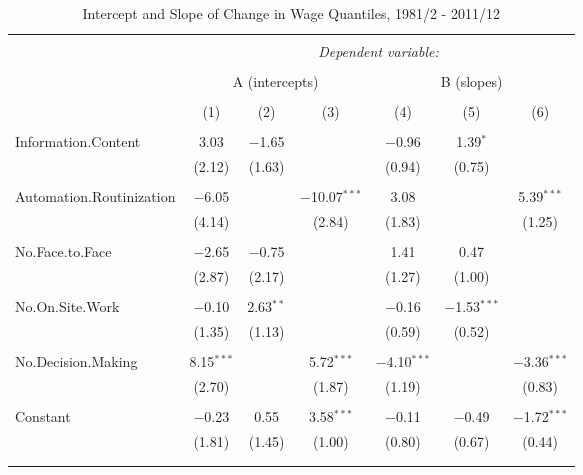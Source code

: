 \documentclass{article}
\begin{document}
\begin{table}[!htbp] \centering 
  \caption{Intercept and Slope of Change in Wage Quantiles, 1981/2 - 2011/12} 
  \label{} 
\begin{tabular}{@{\extracolsep{5pt}}lcccccc} 
\\[-1.8ex]\hline 
\hline \\[-1.8ex] 
 & \multicolumn{6}{c}{\textit{Dependent variable:}} \\ 
\cline{2-7} 
\\[-1.8ex] & \multicolumn{3}{c}{A (intercepts)} & \multicolumn{3}{c}{B (slopes)} \\ 
\\[-1.8ex] & (1) & (2) & (3) & (4) & (5) & (6)\\ 
\hline \\[-1.8ex] 
 Information.Content & 3.03 & $-$1.65 &  & $-$0.96 & 1.39$^{*}$ &  \\ 
  & (2.12) & (1.63) &  & (0.94) & (0.75) &  \\ 
  & & & & & & \\ 
 Automation.Routinization & $-$6.05 &  & $-$10.07$^{***}$ & 3.08 &  & 5.39$^{***}$ \\ 
  & (4.14) &  & (2.84) & (1.83) &  & (1.25) \\ 
  & & & & & & \\ 
 No.Face.to.Face & $-$2.65 & $-$0.75 &  & 1.41 & 0.47 &  \\ 
  & (2.87) & (2.17) &  & (1.27) & (1.00) &  \\ 
  & & & & & & \\ 
 No.On.Site.Work & $-$0.10 & 2.63$^{**}$ &  & $-$0.16 & $-$1.53$^{***}$ &  \\ 
  & (1.35) & (1.13) &  & (0.59) & (0.52) &  \\ 
  & & & & & & \\ 
 No.Decision.Making & 8.15$^{***}$ &  & 5.72$^{***}$ & $-$4.10$^{***}$ &  & $-$3.36$^{***}$ \\ 
  & (2.70) &  & (1.87) & (1.19) &  & (0.83) \\ 
  & & & & & & \\ 
 Constant & $-$0.23 & 0.55 & 3.58$^{***}$ & $-$0.11 & $-$0.49 & $-$1.72$^{***}$ \\ 
  & (1.81) & (1.45) & (1.00) & (0.80) & (0.67) & (0.44) \\ 
  & & & & & & \\ 
\hline \\[-1.8ex] 

\end{tabular}
\end{table}
\end{document}
